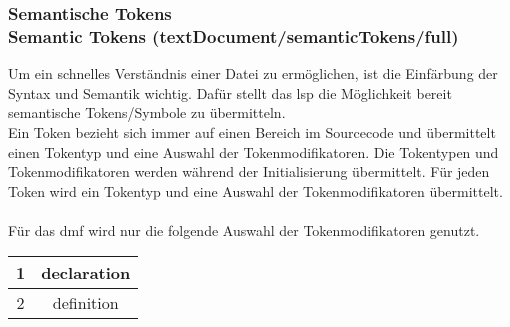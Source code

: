 \documentclass[./einleitung.tex]{subfiles}
\begin{document}
    \subsubsection[Semantische Tokens]{Semantische Tokens\\ {\textnormal{\footnotesize Semantic Tokens (textDocument/semanticTokens/full) \cite{semantic}}}}\label{subsubsec:semantic}
    Um ein schnelles Verständnis einer Datei zu ermöglichen, ist die Einfärbung der Syntax und Semantik wichtig.
    Dafür stellt das \acrshort{lsp} die Möglichkeit bereit semantische Tokens/Symbole zu übermitteln.\\
    Ein Token bezieht sich immer auf einen Bereich im Sourcecode und übermittelt einen Tokentyp und eine Auswahl der Tokenmodifikatoren.
    Die Tokentypen und Tokenmodifikatoren werden während der Initialisierung übermittelt.
    Für jeden Token wird ein Tokentyp und eine Auswahl der Tokenmodifikatoren übermittelt.
    \\\\
    Für das \acrshort{dmf} wird nur die folgende Auswahl der Tokenmodifikatoren genutzt.
    \begin{center}
        \begin{tabular}{|c|c|}
            1 & declaration \\
            \hline
            2 & definition
        \end{tabular}
    \end{center}
\end{document}

